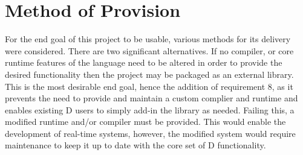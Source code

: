 \section{Method of Provision}
For the end goal of this project to be usable, various methods for its delivery 
were considered. There are two significant alternatives. If no compiler, or 
core runtime features of the language need to be altered in order to provide the 
desired functionality then the project may be packaged as an external library. 
This is the most desirable end goal, hence the addition of requirement 8, as it 
prevents the need to provide and maintain a custom complier and runtime and enables 
existing D users to simply add-in the library as needed. 
Failing this, a modified runtime and/or compiler must be provided. This would 
enable the development of real-time systems, however, the modified system would 
require maintenance to keep it up to date with the core set of D functionality. 

